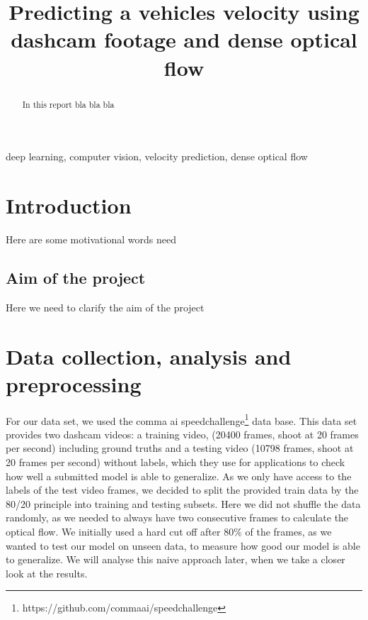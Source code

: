 \documentclass[conference]{IEEEtran}
\begin{document}
\title{Predicting a vehicles velocity using dashcam footage and dense optical flow}

\author{
\and
{}
}

\maketitle

\begin{abstract}
In this report bla bla bla
\end{abstract}

\begin{IEEEkeywords}
deep learning, computer vision, velocity prediction, dense optical flow
\end{IEEEkeywords}

\section{Introduction}
Here are some motivational words need
\subsection{Aim of the project}
Here we need to clarify the aim of the project
 

\section{Data collection, analysis and preprocessing}
For our data set, we used the comma ai speedchallenge\footnote{https://github.com/commaai/speedchallenge} data base. This data
set provides two dashcam videos: a training video, (20400 frames, shoot at 20 frames per second) including 
ground truths and a testing video (10798 frames, shoot at 20 frames per second) without labels, which they use for applications 
to check how well a submitted model is able to generalize.
As we only have access to the labels of the test video frames, we decided to split the provided train data by the 80/20 principle into 
training and testing subsets. Here we did not shuffle the data randomly, as we needed to always have two consecutive frames to 
calculate the optical flow. We initially used a hard cut off after 80$\%$ of the frames, as we wanted to test our model on unseen data, 
to measure how good our model is able to generalize. We will analyse this naive approach later, when we take a closer look
at the results.
\end{document}
